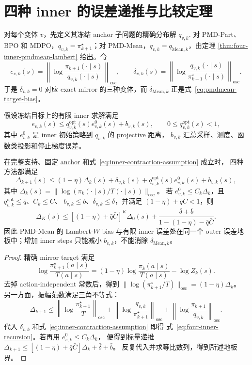 \section{四种 inner 的误差递推与比较定理}
\label{sec:inner-error-comparison}

对每个变体 $v$，先定义其冻结 anchor 子问题的精确分布解
$q_{v,k}$. 对 PMD-Part、BPO 和 MDPO，$q_{v,k}=\pi_{k+1}^{\star}$；对
PMD-Mean，$q_{v,k}=q_{\mathrm{Mean},k}$，由定理
\ref{thm:four-inner-pmdmean-lambert} 给出。令
\[
 e_{v,k}(s)=\left\|\log\frac{\pi_{k+1}(\cdot\mid s)}{q_{v,k}(\cdot\mid s)}\right\|_{\mathrm{osc}},
 \qquad
 \delta_{v,k}(s)=\left\|\log\frac{q_{v,k}(\cdot\mid s)}{\pi_{k+1}^{\star}(\cdot\mid s)}\right\|_{\mathrm{osc}}.
\]
于是 $\delta_{v,k}=0$ 对应 exact mirror 的三种变体，而
$\delta_{\mathrm{Mean},k}$ 正是式~\eqref{eq:pmdmean-target-bias}。

假设冻结目标上的有限 inner 求解满足
\begin{equation}
\label{eq:inner-contraction-assumption}
 e_{v,k}(s)\leq q_{v,k}^{\mathrm{opt}}(s)e_{v,k}^{0}(s)+b_{v,k}(s),
 \qquad 0\leq q_{v,k}^{\mathrm{opt}}(s)<1,
\end{equation}
其中 $e_{v,k}^{0}$ 是 inner 初始策略到 $q_{v,k}$ 的 projective 距离，
$b_{v,k}$ 汇总采样、测度、函数类投影和停止梯度误差。

\begin{theorem}
\label{thm:four-inner-recursion}
在完整支持、固定 anchor 和式~\eqref{eq:inner-contraction-assumption} 成立时，
四种方法都满足
\begin{equation}
\label{eq:four-inner-recursion}
 \Delta_{k+1}(s)
 \leq (1-\eta)\Delta_k(s)+\delta_{v,k}(s)
 +q_{v,k}^{\mathrm{opt}}(s)e_{v,k}^{0}(s)+b_{v,k}(s),
\end{equation}
其中
$\Delta_k(s)=\|\log(\pi_k(\cdot\mid s)/T(\cdot\mid s))\|_{\mathrm{osc}}$。
若 $e_{v,k}^{0}\leq C_k\Delta_k$，且
$q_{v,k}^{\mathrm{opt}}\leq\bar q$、$C_k\leq\bar C$、
$b_{v,k}\leq\bar b$、$\delta_{v,k}\leq\bar\delta$，并满足
$(1-\eta)+\bar q\bar C<1$，则
\[
 \Delta_K(s)
 \leq[(1-\eta)+\bar q\bar C]^K\Delta_0(s)
 +\frac{\bar\delta+\bar b}{1-(1-\eta)-\bar q\bar C}.
\]
因此 PMD-Mean 的 Lambert-$W$ bias 与有限 inner 误差处在同一个
outer 误差地板中；增加 inner steps 只能减小 $b_{v,k}$，不能消除
$\delta_{\mathrm{Mean},k}$。
\end{theorem}

\begin{proof}
精确 mirror target 满足
\[
 \log\frac{\pi_{k+1}^{\star}(a\mid s)}{T(a\mid s)}
 =(1-\eta)\log\frac{\pi_k(a\mid s)}{T(a\mid s)}-\log Z_k(s).
\]
去掉 action-independent 常数后，得到
$\|\log(\pi_{k+1}^{\star}/T)\|_{\mathrm{osc}}=(1-\eta)\Delta_k$。
另一方面，振幅范数满足三角不等式：
\[
 \Delta_{k+1}
 \leq \left\|\log\frac{\pi_{k+1}^{\star}}T\right\|_{\mathrm{osc}}
 +\left\|\log\frac{q_{v,k}}{\pi_{k+1}^{\star}}\right\|_{\mathrm{osc}}
 +\left\|\log\frac{\pi_{k+1}}{q_{v,k}}\right\|_{\mathrm{osc}}.
\]
代入 $\delta_{v,k}$ 和式~\eqref{eq:inner-contraction-assumption} 即得
式~\eqref{eq:four-inner-recursion}。若再用 $e_{v,k}^{0}\leq C_k\Delta_k$，
便得到标量递推
$\Delta_{k+1}\leq[(1-\eta)+\bar q\bar C]\Delta_k+\bar\delta+\bar b$。
反复代入并求等比数列，得到所述地板界。
\end{proof}

